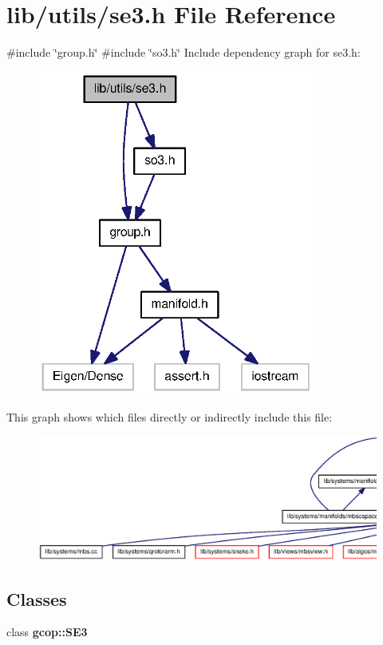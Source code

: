 \section{lib/utils/se3.h \-File \-Reference}
\label{se3_8h}
{\ttfamily \#include \char`\"{}group.\-h\char`\"{}}\*
{\ttfamily \#include \char`\"{}so3.\-h\char`\"{}}\*
\-Include dependency graph for se3.\-h\-:
\nopagebreak
\begin{figure}[H]
\begin{center}
\leavevmode
\includegraphics[width=258pt]{se3_8h__incl}
\end{center}
\end{figure}
\-This graph shows which files directly or indirectly include this file\-:
\nopagebreak
\begin{figure}[H]
\begin{center}
\leavevmode
\includegraphics[width=350pt]{se3_8h__dep__incl}
\end{center}
\end{figure}
\subsection*{\-Classes}
\begin{DoxyCompactItemize}
\item 
class {\bf gcop\-::\-S\-E3}
\end{DoxyCompactItemize}
